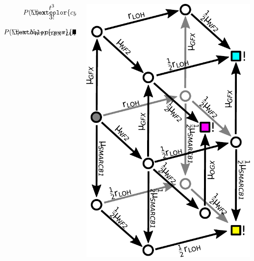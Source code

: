 \documentclass{beamer}
\begin{document}
\begin{frame}
\begin{columns}
\begin{column}{0.5\textwidth}
    \begin{equation*}
        P(\mathrlap{\textcolor{cyan}{\blacksquare}}\Box) \propto \frac{t^3}{3!}
    \end{equation*}
    \begin{equation*}
        P(\mathrlap{\textcolor{cyan}{\blacksquare}}\Box) \approx N_{WT} \mu_{GFX}
        r_{LOH} \frac{1}{2} \mu_{NF2} \frac{t^3}{3!}  \times 6
    \end{equation*}
        \end{column}
        \begin{column}{0.5\textwidth}
        \begin{center}
            \includegraphics[height=0.8\textheight]{figures/vsmodel-nochromosomes.pdf}
        \end{center}
        \end{column}
    \end{columns}
    
\end{frame}
\end{document}
